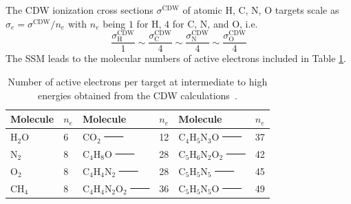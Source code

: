 \documentclass[10pt,showpacs,showkeys,twocolumn]{revtex4-1} %
\providecommand{\DIFadd}[1]{{\protect\color{blue}\uwave{#1}}} %
\providecommand{\DIFdel}[1]{{\protect\color{red}\sout{#1}}}                      %
\providecommand{\DIFaddbegin}{} %
\providecommand{\DIFaddend}{} %
\providecommand{\DIFdelbegin}{} %
\providecommand{\DIFdelFL}[1]{\DIFdel{#1}} %
\providecommand{\DIFaddbeginFL}{} %
\providecommand{\DIFaddendFL}{} %
\providecommand{\DIFdelbeginFL}{} %
\providecommand{\DIFdelendFL}{} %
\newcommand{\DIFscaledelfig}{0.5}
\newlength{\DIFdelgraphicswidth} %
\newlength{\DIFdelgraphicsheight} %
\newcommand{\DIFaddincludegraphics}[2][]{{\color{blue}\fbox{\DIFOincludegraphics[#1]{#2}}}} %
\newcommand{\DIFdelincludegraphics}[2][]{%
\sbox{\DIFdelgraphicsbox}{\DIFOincludegraphics[#1]{#2}}%
\settoboxwidth{\DIFdelgraphicswidth}{\DIFdelgraphicsbox} %
\settoboxtotalheight{\DIFdelgraphicsheight}{\DIFdelgraphicsbox} %
\scalebox{\DIFscaledelfig}{%
\parbox[b]{\DIFdelgraphicswidth}{\usebox{\DIFdelgraphicsbox}\\[-\baselineskip] \rule{\DIFdelgraphicswidth}{0em}}\llap{\resizebox{\DIFdelgraphicswidth}{\DIFdelgraphicsheight}{%
\setlength{\unitlength}{\DIFdelgraphicswidth}%
\begin{picture}(1,1)%
\thicklines\linethickness{2pt} %
{\color[rgb]{1,0,0}\put(0,0){\framebox(1,1){}}}%
{\color[rgb]{1,0,0}\put(0,0){\line( 1,1){1}}}%
{\color[rgb]{1,0,0}\put(0,1){\line(1,-1){1}}}%
\end{picture}%
}\hspace*{3pt}}} %
} %
\DeclareRobustCommand{\DIFaddbegin}{\DIFOaddbegin \let\includegraphics\DIFaddincludegraphics} %
\DeclareRobustCommand{\DIFaddend}{\DIFOaddend \let\includegraphics\DIFOincludegraphics} %
\DeclareRobustCommand{\DIFdelbegin}{\DIFOdelbegin \let\includegraphics\DIFdelincludegraphics} %
\DeclareRobustCommand{\DIFaddbeginFL}{\DIFOaddbeginFL \let\includegraphics\DIFaddincludegraphics} %
\DeclareRobustCommand{\DIFaddendFL}{\DIFOaddendFL \let\includegraphics\DIFOincludegraphics} %
\DeclareRobustCommand{\DIFdelbeginFL}{\DIFOdelbeginFL \let\includegraphics\DIFdelincludegraphics} %
\DeclareRobustCommand{\DIFdelendFL}{\DIFOaddendFL \let\includegraphics\DIFOincludegraphics} %
\begin{document}
\DIFaddend The CDW ionization cross sections $\sigma^{\mathrm{CDW}}$ of atomic H, 
C, N, O targets scale as $\sigma_e=\sigma^{\mathrm{CDW}}/n_e$ with $n_e$ 
being $1$ for H, $4$ for C, N, and O, i.e.\DIFaddbegin \DIFadd{,
}\DIFaddend \begin{equation}
 \frac{\sigma_{\mathrm{H}}^{\mathrm{CDW}}}{1}\sim
 \frac{\sigma_{\mathrm{C}}^{\mathrm{CDW}}}{4}\sim
 \frac{\sigma_{\mathrm{N}}^{\mathrm{CDW}}}{4}\sim
 \frac{\sigma_{\mathrm{O}}^{\mathrm{CDW}}}{4}
\end{equation}
The SSM leads to the molecular numbers of active electrons included in 
Table \ref{nn}.

\contourlength{0.03em}

\DIFdelbegin %
\DIFdelendFL \DIFaddbeginFL \begin{table}[t]
\DIFaddendFL \begin{center}
\begin{tabular}{|ll|ll|ll|}
\hline
 Molecule & $n_e$ & Molecule          & $n_e$ & Molecule          & $n_e$ \\
\hline
 H$_2$O   & 6  & CO$_2$               \DIFdelbeginFL \DIFdelFL{\ \ \ \ }\DIFdelendFL & 12 & C$_4$H$_5$N$_3$O     \DIFdelbeginFL \DIFdelFL{\ \ \ \ }\DIFdelendFL & 37   \\ 
 N$_2$    & 8  & C$_4$H$_8$O          \DIFdelbeginFL \DIFdelFL{\ \ \ \ }\DIFdelendFL & 28 & C$_5$H$_6$N$_2$O$_2$ \DIFdelbeginFL \DIFdelFL{\ \ \ \ }\DIFdelendFL & 42   \\ 
 O$_2$    & 8  & C$_4$H$_4$N$_2$      \DIFdelbeginFL \DIFdelFL{\ \ \ \  }\DIFdelendFL & 28 & C$_5$H$_5$N$_5$      \DIFdelbeginFL \DIFdelFL{\ \ \ \ }\DIFdelendFL & 45   \\ 
 CH$_4$   & 8  & C$_4$H$_4$N$_2$O$_2$ \DIFdelbeginFL \DIFdelFL{\ \ \ \ }\DIFdelendFL & 36 & C$_5$H$_5$N$_5$O     \DIFdelbeginFL \DIFdelFL{\ \ \ \ }\DIFdelendFL & 49   \\ 
 \hline
\end{tabular}
\caption{Number of active electrons per target at intermediate to high 
energies obtained from the CDW calculations~\cite{MendezJPB20}.}
\label{nn}
\end{center}
\end{table}
\end{document}
